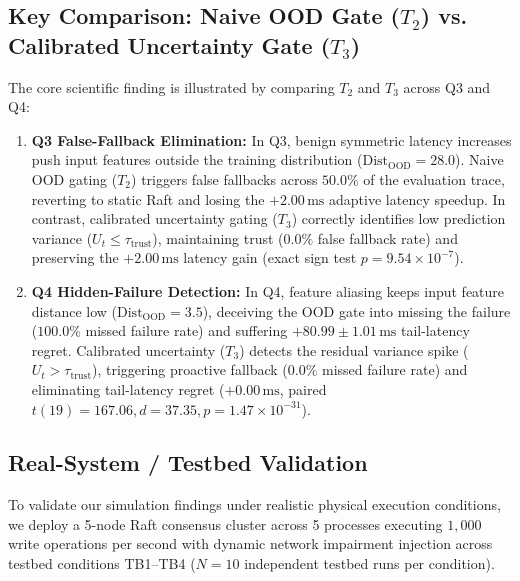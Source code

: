 \subsection{Key Comparison: Naive OOD Gate ($T_2$) vs. Calibrated Uncertainty Gate ($T_3$)}
The core scientific finding is illustrated by comparing $T_2$ and $T_3$ across Q3 and Q4:
\begin{enumerate}
    \item \textbf{Q3 False-Fallback Elimination:} In Q3, benign symmetric latency increases push input features outside the training distribution ($\text{Dist}_{\text{OOD}} = 28.0$). Naive OOD gating ($T_2$) triggers false fallbacks across $50.0\%$ of the evaluation trace, reverting to static Raft and losing the $+2.00\,\text{ms}$ adaptive latency speedup. In contrast, calibrated uncertainty gating ($T_3$) correctly identifies low prediction variance ($U_t \le \tau_{\text{trust}}$), maintaining trust ($0.0\%$ false fallback rate) and preserving the $+2.00\,\text{ms}$ latency gain (exact sign test $p = 9.54 \times 10^{-7}$).
    \item \textbf{Q4 Hidden-Failure Detection:} In Q4, feature aliasing keeps input feature distance low ($\text{Dist}_{\text{OOD}} = 3.5$), deceiving the OOD gate into missing the failure ($100.0\%$ missed failure rate) and suffering $+80.99 \pm 1.01\,\text{ms}$ tail-latency regret. Calibrated uncertainty ($T_3$) detects the residual variance spike ($U_t > \tau_{\text{trust}}$), triggering proactive fallback ($0.0\%$ missed failure rate) and eliminating tail-latency regret ($+0.00\,\text{ms}$, paired $t(19) = 167.06, d = 37.35, p = 1.47 \times 10^{-31}$).
\end{enumerate}

\subsection{Real-System / Testbed Validation}
To validate our simulation findings under realistic physical execution conditions, we deploy a 5-node Raft consensus cluster across 5 processes executing $1,000$ write operations per second with dynamic network impairment injection across testbed conditions TB1--TB4 ($N=10$ independent testbed runs per condition).

